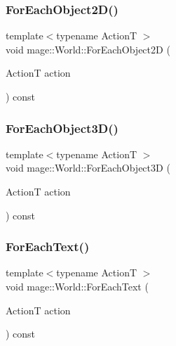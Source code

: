 \subsubsection{\texorpdfstring{For\+Each\+Object2\+D()}{ForEachObject2D()}}
{\footnotesize\ttfamily template$<$typename ActionT $>$ \\
void mage\+::\+World\+::\+For\+Each\+Object2D (\begin{DoxyParamCaption}\item[{ActionT}]{action }\end{DoxyParamCaption}) const}

\hypertarget{classmage_1_1_world_aeaf99d59687121c072d483a98a726eff}{}\label{classmage_1_1_world_aeaf99d59687121c072d483a98a726eff} 
\subsubsection{\texorpdfstring{For\+Each\+Object3\+D()}{ForEachObject3D()}}
{\footnotesize\ttfamily template$<$typename ActionT $>$ \\
void mage\+::\+World\+::\+For\+Each\+Object3D (\begin{DoxyParamCaption}\item[{ActionT}]{action }\end{DoxyParamCaption}) const}

\hypertarget{classmage_1_1_world_a55cad8c75836c4639929a153cdf0d3b4}{}\label{classmage_1_1_world_a55cad8c75836c4639929a153cdf0d3b4} 
\subsubsection{\texorpdfstring{For\+Each\+Text()}{ForEachText()}}
{\footnotesize\ttfamily template$<$typename ActionT $>$ \\
void mage\+::\+World\+::\+For\+Each\+Text (\begin{DoxyParamCaption}\item[{ActionT}]{action }\end{DoxyParamCaption}) const}

\hypertarget{classmage_1_1_world_a3bf269d64b5cf04264e983f41b94223c}{}\label{classmage_1_1_world_a3bf269d64b5cf04264e983f41b94223c} 
